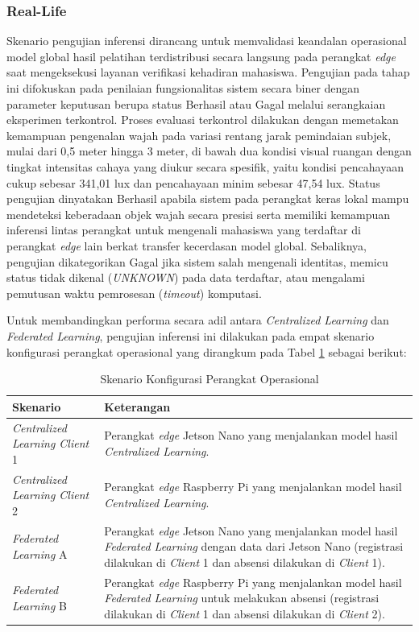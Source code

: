 \subsubsection{Real-Life}

Skenario pengujian inferensi dirancang untuk memvalidasi keandalan operasional model global hasil pelatihan terdistribusi secara langsung pada perangkat \textit{edge} saat mengeksekusi layanan verifikasi kehadiran mahasiswa. Pengujian pada tahap ini difokuskan pada penilaian fungsionalitas sistem secara biner dengan parameter keputusan berupa status Berhasil atau Gagal melalui serangkaian eksperimen terkontrol. Proses evaluasi terkontrol dilakukan dengan memetakan kemampuan pengenalan wajah pada variasi rentang jarak pemindaian subjek, mulai dari 0,5 meter hingga 3 meter, di bawah dua kondisi visual ruangan dengan tingkat intensitas cahaya yang diukur secara spesifik, yaitu kondisi pencahayaan cukup sebesar 341,01 lux dan pencahayaan minim sebesar 47,54 lux. Status pengujian dinyatakan Berhasil apabila sistem pada perangkat keras lokal mampu mendeteksi keberadaan objek wajah secara presisi serta memiliki kemampuan inferensi lintas perangkat untuk mengenali mahasiswa yang terdaftar di perangkat \textit{edge} lain berkat transfer kecerdasan model global. Sebaliknya, pengujian dikategorikan Gagal jika sistem salah mengenali identitas, memicu status tidak dikenal (\textit{UNKNOWN}) pada data terdaftar, atau mengalami pemutusan waktu pemrosesan (\textit{timeout}) komputasi.

Untuk membandingkan performa secara adil antara \textit{Centralized Learning} dan \textit{Federated Learning}, pengujian inferensi ini dilakukan pada empat skenario konfigurasi perangkat operasional yang dirangkum pada Tabel \ref{tab:skenario-operasional} sebagai berikut:

\begin{table}[H]
  \centering
  \caption{Skenario Konfigurasi Perangkat Operasional}
  \label{tab:skenario-operasional}
  \begin{tabular}{|l|p{9.5cm}|}
    \hline
    \textbf{Skenario} & \textbf{Keterangan} \\
    \hline
    \textit{Centralized Learning Client} 1 & Perangkat \textit{edge} Jetson Nano yang menjalankan model hasil \textit{Centralized Learning}. \\
    \textit{Centralized Learning Client} 2 & Perangkat \textit{edge} Raspberry Pi yang menjalankan model hasil \textit{Centralized Learning}. \\
    \textit{Federated Learning} A & Perangkat \textit{edge} Jetson Nano yang menjalankan model hasil \textit{Federated Learning} dengan data dari Jetson Nano (registrasi dilakukan di \textit{Client} 1 dan absensi dilakukan di \textit{Client} 1). \\
    \textit{Federated Learning} B & Perangkat \textit{edge} Raspberry Pi yang menjalankan model hasil \textit{Federated Learning} untuk melakukan absensi (registrasi dilakukan di \textit{Client} 1 dan absensi dilakukan di \textit{Client} 2). \\
    \hline
  \end{tabular}
\end{table}

